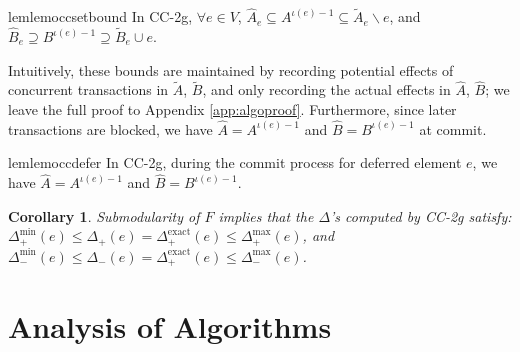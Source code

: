 \documentclass{article} %
\newcommand{\hogwild}{CF-2g}
\newcommand{\occ}{CC-2g}
\newtheorem{cor}[thm]{Corollary}
\newcommand{\algref}[1]{Alg.~\ref{#1}}
\begin{document}
\begin{restatable}{lem}{lemoccsetbound}\label{lem:occ:set_bound}
In \occ{}, $\forall e\in V$,
$\hat{A}_e \subseteq A^{\iota(e)-1} \subseteq \tilde{A}_e \backslash e$, and $\hat{B}_e \supseteq B^{\iota(e)-1} \supseteq \tilde{B}_e \cup e$.
\end{restatable}
Intuitively, these bounds are maintained by recording potential effects of concurrent transactions in $\tilde{A}$, $\tilde{B}$, and only recording the actual effects in $\hat{A}$, $\hat{B}$;
we leave the full proof to Appendix \ref{app:algoproof}.
Furthermore, since later transactions are blocked, we have $\hat{A} = A^{\iota(e)-1}$ and $\hat{B} = B^{\iota(e)-1}$ at commit.

\begin{restatable}{lem}{lemoccdefer}\label{lem:occ:defer}
In \occ{}, during the commit process for deferred element $e$, we have $\hat{A} = A^{\iota(e)-1}$ and $\hat{B} = B^{\iota(e)-1}$.
\end{restatable}


\begin{cor}\label{cor:occ:delta_bound} Submodularity of $F$ implies that the $\Delta$'s computed by \occ{} satisfy: $\Delta_+^{\min}(e) \leq \Delta_+(e) = \Delta_+^{\text{exact}}(e) \leq \Delta_+^{\max}(e)$, and $\Delta_-^{\min}(e) \leq \Delta_-(e) = \Delta_+^{\text{exact}}(e) \leq \Delta_-^{\max}(e)$.
\end{cor}
















\section{Analysis of Algorithms \label{sec:analysis}}
\end{document}
